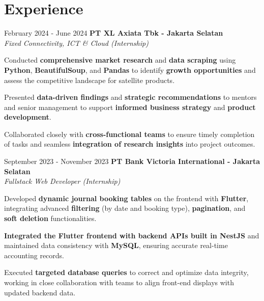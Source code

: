 \documentclass[../main.tex]{subfiles}
\begin{document}
\section{Experience}

\begin{twocolentry}{February 2024 - June 2024}
    \textbf{PT XL Axiata Tbk \color{Gray}- Jakarta Selatan}\\
    \textit{Fixed Connectivity, ICT \& Cloud (Internship)}
\end{twocolentry}

\vspace{0.10 cm}
\begin{onecolentry}
\begin{highlights}
    \item Conducted \textbf{comprehensive market research} and \textbf{data scraping} using \textbf{Python}, \textbf{BeautifulSoup}, and \textbf{Pandas} to identify \textbf{growth opportunities} and assess the competitive landscape for satellite products.
    \item Presented \textbf{data-driven findings} and \textbf{strategic recommendations} to mentors and senior management to support \textbf{informed business strategy} and \textbf{product development}.
    \item Collaborated closely with \textbf{cross-functional teams} to ensure timely completion of tasks and seamless \textbf{integration of research insights} into project outcomes.
\end{highlights}
\end{onecolentry}

\vspace{0.40 cm}

\begin{twocolentry}{September 2023 - November 2023}
    \textbf{PT Bank Victoria International \color{Gray}- Jakarta Selatan}\\
    \textit{Fullstack Web Developer (Internship)}
\end{twocolentry}

\vspace{0.10 cm}
\begin{onecolentry}
\begin{highlights}
    \item Developed \textbf{dynamic journal booking tables} on the frontend with \textbf{Flutter}, integrating advanced \textbf{filtering} (by date and booking type), \textbf{pagination}, and \textbf{soft deletion} functionalities.
    \item \textbf{Integrated the Flutter frontend with backend APIs built in NestJS} and maintained data consistency with \textbf{MySQL}, ensuring accurate real-time accounting records.
    \item Executed \textbf{targeted database queries} to correct and optimize data integrity, working in close collaboration with teams to align front-end displays with updated backend data.
\end{highlights}
\end{onecolentry}
\end{document}
